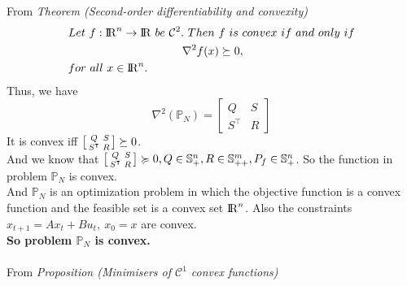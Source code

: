 \documentclass[a4paper,11pt,reqno]{amsart}
\newcommand{\R}{{\rm I\!R}}
\newcommand{\tran}{\intercal}
\DeclareMathOperator*{\minimise}{minimise}
\begin{document}
From \textit{Theorem (Second-order differentiability and convexity)}
\begin{align}
    &Let\ f : \R^n\rightarrow\R\ be\ \mathcal{C}^2.\ Then\ f\ is\ convex\ if\ and\ only\ if
    \notag
    \\
    &\qquad\qquad\qquad\qquad\qquad \nabla ^2f(x)\succeq   0,
    \\
    &for\ all\ x \in\R^n.
    \notag
\end{align}
Thus, we have
\begin{equation}
    \nabla ^2(\mathbb{P}_N)=
    \begin{bmatrix}
        Q&S\\
        S^{\tran}&R
    \end{bmatrix}
\end{equation}
It is convex iff $\begin{bsmallmatrix}Q&S\\S^{\tran}&R\end{bsmallmatrix}\succeq 0$.
\\
And we know that $\begin{bsmallmatrix}Q&S\\S^{\tran}&R\end{bsmallmatrix}\succcurlyeq 0, Q\in \mathbb{S}^n_+, R\in \mathbb{S}^m_{++}, P_f\in \mathbb{S}^n_{+}$. So the function in problem $\mathbb{P}_N$ is convex. 
\\
And $\mathbb{P}_N$ is an optimization problem in which the objective function is a convex function and the feasible set is a convex set $\R^n$.
Also the constraints $x_{t+1}=Ax_t+Bu_t,\ x_0=x$ are convex.
\\
\textbf{So problem $\mathbb{P}_N$ is convex.}
\\ \\
From \textit{Proposition (Minimisers of $\mathcal{C}^1$ convex functions)}
\end{document}
